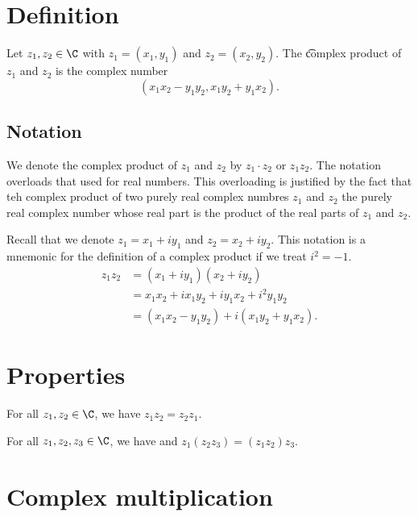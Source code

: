 
\section*{Definition}

Let $z_1, z_2 \in \C $ with $z_1 = (x_1, y_1)$ and $z_2 = (x_2, y_2)$.
The \t{complex product} of $z_1$ and $z_2$ is the complex number
  \[
(x_1x_2 - y_1y_2, x_1y_2 + y_1x_2).
  \]

\subsection*{Notation}

We denote the complex product of $z_1$ and $z_2$ by $z_1 \cdot  z_2$ or $z_1z_2$.
The notation overloads that used for real numbers.
This overloading is justified by the fact that teh complex product of two purely real complex numbres $z_1$ and $z_2$ the purely real complex number whose real part is the product of the real parts of $z_1$ and $z_2$.

Recall that we denote $z_1 = x_1 + iy_1$ and $z_2 = x_2 + iy_2$.
This notation is a mnemonic for the definition of a complex product if we treat $i^2 = -1$.
  \[
\begin{aligned}
z_1z_2 &= (x_1 + iy_1)(x_2 + iy_2) \\
&= x_1x_2 + ix_1y_2 + iy_1x_2 + i^2 y_1y_2 \\
&= (x_1x_2 - y_1y_2) + i(x_1y_2 + y_1x_2).
\end{aligned}
  \]

\section*{Properties}

\begin{proposition}[Commutativity]
For all $z_1, z_2 \in \C $, we have $z_1z_2 = z_2z_1$.
\end{proposition}

\begin{proposition}[Associativity]
For all $z_1, z_2, z_3 \in \C $, we have
and $z_1(z_2z_3) = (z_1z_2)z_3$.
\end{proposition}

\section*{Complex multiplication}

